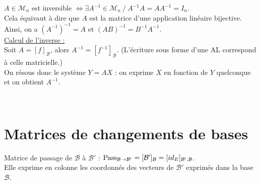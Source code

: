     $A \in \mathcal{M}_n$ est inversible $\iff \exists A^{-1} \in \mathcal{M}_n\ /\ A^{-1}A = AA^{-1} = I_n$.\\
    Cela équivaut à dire que $A$ est la matrice d'une application linéaire bijective.\\

    Ainsi, on a $(A^{-1})^{-1} = A$ et $(AB)^{-1} = B^{-1} A^{-1}$.\\

    \underline{Calcul de l'inverse :} \vspace{4pt}\\
    Soit $A = [f]_\mathcal{B}$, alors $A^{-1} = [f^{-1}]_\mathcal{B}$.
    (L'écriture sous forme d'une AL correspond à celle matricielle.) \vspace{2pt}\\
    On résous donc le système $Y = AX$ : on exprime $X$ en fonction de $Y$ quelconque et on obtient $A^{-1}$.

    \vspace{1pt}\\


\section{Matrices de changements de bases}

    Matrice de passage de $\mathcal{B}$ à $\mathcal{B}'$ : $\textrm{Pass}_{\mathcal{B} \rightarrow \mathcal{B}'} = [\mathcal{B}']_\mathcal{B} =  [id_E]_{\mathcal{B}',\mathcal{B}}$.\\
    Elle exprime en colonne les coordonnés des vecteurs de $\mathcal{B}'$ exprimés dans la base $\mathcal{B}$.\\

